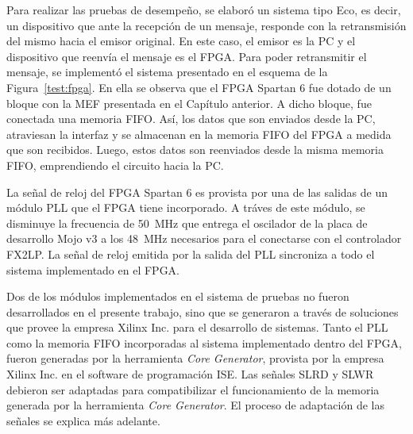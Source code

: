 Para realizar las pruebas de desempeño, se elaboró un sistema tipo Eco, es decir, un dispositivo que ante la recepción de un mensaje, responde con la retransmisión del mismo hacia el emisor original. En este caso, el emisor es la PC y el dispositivo que reenvía el mensaje es el FPGA. Para poder retransmitir el mensaje, se implementó el sistema presentado en el esquema de la Figura~\ref{test:fpga}. En ella se observa que el FPGA Spartan 6 fue dotado de un bloque con la MEF presentada en el Capítulo anterior. A dicho bloque, fue conectada una memoria FIFO. Así, los datos que son enviados desde la PC, atraviesan la interfaz y se almacenan en la memoria FIFO del FPGA a medida que son recibidos. Luego, estos datos son reenviados desde la misma memoria FIFO, emprendiendo el circuito hacia la PC.

La señal de reloj del FPGA Spartan 6 es provista por una de las salidas de un módulo PLL que el FPGA tiene incorporado. A tráves de este módulo, se disminuye la frecuencia de \SI{50}{\mega\hertz} que entrega el oscilador de la placa de desarrollo Mojo v3 a los \SI{48}{\mega\hertz} necesarios para el conectarse con el controlador FX2LP. La señal de reloj emitida por la salida del PLL sincroniza a todo el sistema implementado en el FPGA. 

Dos de los módulos implementados en el sistema de pruebas no fueron desarrollados en el presente trabajo, sino que se generaron a través de soluciones que provee la empresa Xilinx Inc. para el desarrollo de sistemas. Tanto el PLL como la memoria FIFO incorporadas al sistema implementado dentro del FPGA, fueron generadas por la herramienta \textit{Core Generator}, provista por la empresa Xilinx Inc. en el software de programación ISE. Las señales SLRD y SLWR debieron ser adaptadas para compatibilizar el funcionamiento de la memoria generada por la herramienta \textit{Core Generator}. El proceso de adaptación de las señales se explica más adelante.

